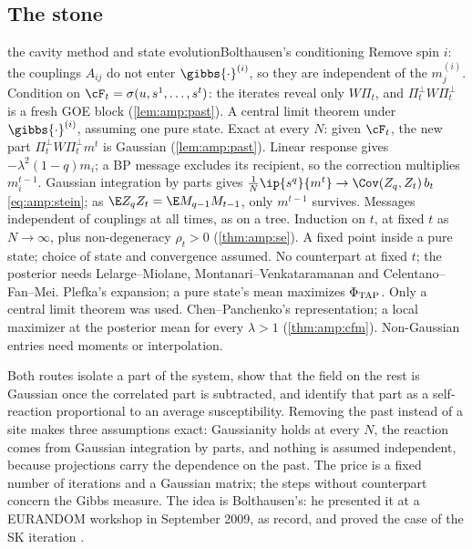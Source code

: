 \begin{refsection}
\section{The stone}\label{sec:amp:stone}

\begin{stone}{the cavity method and state evolution}{Bolthausen's conditioning}
{Remove spin $i$: the couplings $A_{ij}$ do not enter $\gibbs{\cdot}^{(i)}$, so they are independent of the $m_j^{(i)}$.}
{Condition on $\cF_t=\sigma(u,s^1,\dots,s^t)$: the iterates reveal only $W\Pi_t$, and $\Pi_t^\perp W\Pi_t^\perp$ is a fresh GOE block (\cref{lem:amp:past}).}
{A central limit theorem under $\gibbs{\cdot}^{(i)}$, assuming one pure state.}
{Exact at every $N$: given $\cF_t$, the new part $\Pi_t^\perp W\Pi_t^\perp m^t$ is Gaussian (\cref{lem:amp:past}).}
{Linear response gives $-\lambda^2(1-q)m_i$; a BP message excludes its recipient, so the correction multiplies $m^{t-1}_i$.}
{Gaussian integration by parts gives $\frac1N\ip{s^q}{m^t}\to\Cov(Z_q,Z_t)\,b_t$ \eqref{eq:amp:stein}; as $\E Z_qZ_t=\E M_{q-1}M_{t-1}$, only $m^{t-1}$ survives.}
{Messages independent of couplings at all times, as on a tree.}
{Induction on $t$, at fixed $t$ as $N\to\infty$, plus non-degeneracy $\rho_t>0$ (\cref{thm:amp:se}).}
{A fixed point inside a pure state; choice of state and convergence assumed.}
{No counterpart at fixed $t$; the posterior needs Lelarge--Miolane, Montanari--Venkataramanan and Celentano--Fan--Mei.}
{Plefka's expansion; a pure state's mean maximizes $\Phi_{\mathrm{TAP}}$. Only a central limit theorem was used.}
{Chen--Panchenko's representation; a local maximizer at the posterior mean for every $\lambda>1$ (\cref{thm:amp:cfm}). Non-Gaussian entries need moments or interpolation.}
\end{stone}

Both routes isolate a part of the system, show that the field on the rest is Gaussian once the correlated part is subtracted, and identify that part as a self-reaction proportional to an average susceptibility. Removing the past instead of a site makes three assumptions exact: Gaussianity holds at every $N$, the reaction comes from Gaussian integration by parts, and nothing is assumed independent, because projections carry the dependence on the past. The price is a fixed number of iterations and a Gaussian matrix; the steps without counterpart concern the Gibbs measure. The idea is Bolthausen's: he presented it at a EURANDOM workshop in September 2009, as \textcite{BayatiMontanari2011} record, and proved the case of the SK iteration \parencite{Bolthausen2014}.


\end{refsection}
